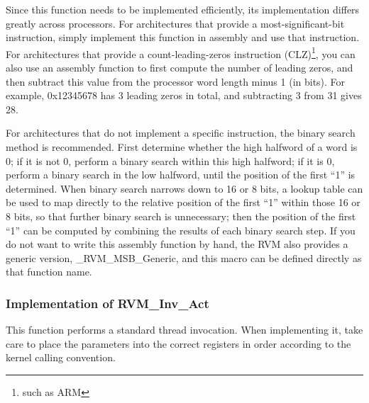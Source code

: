 Since this function needs to be implemented efficiently, its implementation differs greatly across processors. For architectures that provide a most-significant-bit instruction, simply implement this function in assembly and use that instruction. For architectures that provide a count-leading-zeros instruction (CLZ)\footnote{such as ARM}, you can also use an assembly function to first compute the number of leading zeros, and then subtract this value from the processor word length minus 1 (in bits). For example, 0x12345678 has 3 leading zeros in total, and subtracting 3 from 31 gives 28.

For architectures that do not implement a specific instruction, the binary search method is recommended. First determine whether the high halfword of a word is 0; if it is not 0, perform a binary search within this high halfword; if it is 0, perform a binary search in the low halfword, until the position of the first ``1'' is determined. When binary search narrows down to 16 or 8 bits, a lookup table can be used to map directly to the relative position of the first ``1'' within those 16 or 8 bits, so that further binary search is unnecessary; then the position of the first ``1'' can be computed by combining the results of each binary search step. If you do not want to write this assembly function by hand, the RVM also provides a generic version, \_RVM\_MSB\_Generic, and this macro can be defined directly as that function name.

\subsubsection{Implementation of RVM\_Inv\_Act}\label{subsubsec:8-2-6-4}

This function performs a standard thread invocation. When implementing it, take care to place the parameters into the correct registers in order according to the kernel calling convention.

